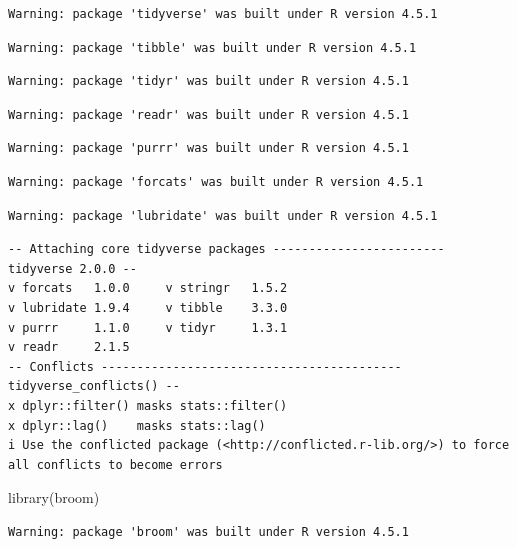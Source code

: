 \documentclass[
  letterpaper,
  DIV=11,
  numbers=noendperiod]{scrreprt}
\newenvironment{Shaded}{\begin{snugshade}}{\end{snugshade}}
\newcommand{\FunctionTok}[1]{\textcolor[rgb]{0.28,0.35,0.67}{#1}}
\newcommand{\NormalTok}[1]{\textcolor[rgb]{0.00,0.23,0.31}{#1}}
\begin{document}
\begin{verbatim}
Warning: package 'tidyverse' was built under R version 4.5.1
\end{verbatim}

\begin{verbatim}
Warning: package 'tibble' was built under R version 4.5.1
\end{verbatim}

\begin{verbatim}
Warning: package 'tidyr' was built under R version 4.5.1
\end{verbatim}

\begin{verbatim}
Warning: package 'readr' was built under R version 4.5.1
\end{verbatim}

\begin{verbatim}
Warning: package 'purrr' was built under R version 4.5.1
\end{verbatim}

\begin{verbatim}
Warning: package 'forcats' was built under R version 4.5.1
\end{verbatim}

\begin{verbatim}
Warning: package 'lubridate' was built under R version 4.5.1
\end{verbatim}

\begin{verbatim}
-- Attaching core tidyverse packages ------------------------ tidyverse 2.0.0 --
v forcats   1.0.0     v stringr   1.5.2
v lubridate 1.9.4     v tibble    3.3.0
v purrr     1.1.0     v tidyr     1.3.1
v readr     2.1.5     
-- Conflicts ------------------------------------------ tidyverse_conflicts() --
x dplyr::filter() masks stats::filter()
x dplyr::lag()    masks stats::lag()
i Use the conflicted package (<http://conflicted.r-lib.org/>) to force all conflicts to become errors
\end{verbatim}

\begin{Shaded}
\begin{Highlighting}[]
\FunctionTok{library}\NormalTok{(broom)}
\end{Highlighting}
\end{Shaded}

\begin{verbatim}
Warning: package 'broom' was built under R version 4.5.1
\end{verbatim}
\end{document}
